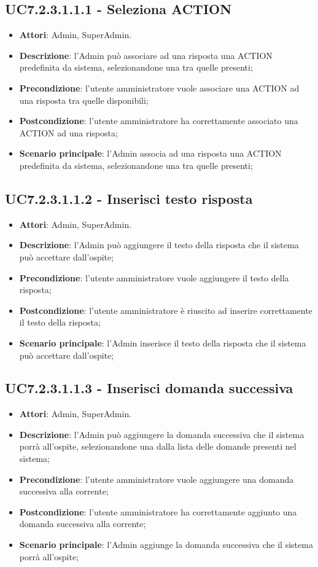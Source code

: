 \documentclass[../AnalisiDeiRequisiti_v3.0.0.tex]{subfiles}
\begin{document}
\subsection{UC7.2.3.1.1.1 - Seleziona ACTION} 
\label{sssec:UC7.2.3.1.1.1} 
\begin{itemize} 
\item \textbf{Attori}: Admin, SuperAdmin.
\item \textbf{Descrizione}: l'Admin può associare ad una risposta una ACTION predefinita da sistema, selezionandone una tra quelle presenti;
\item \textbf{Precondizione}: l'utente amministratore vuole associare una ACTION ad una risposta tra quelle disponibili;
\item \textbf{Postcondizione}: l'utente amministratore ha correttamente associato una ACTION ad una risposta;\item \textbf{Scenario principale}: l'Admin associa ad una risposta una ACTION predefinita da sistema, selezionandone una tra quelle presenti;
\end{itemize} 
\subsection{UC7.2.3.1.1.2 - Inserisci testo risposta} 
\label{sssec:UC7.2.3.1.1.2} 
\begin{itemize} 
\item \textbf{Attori}: Admin, SuperAdmin.
\item \textbf{Descrizione}: l'Admin può aggiungere il testo della risposta che il sistema può accettare dall'ospite;
\item \textbf{Precondizione}: l'utente amministratore vuole aggiungere il testo della risposta;
\item \textbf{Postcondizione}: l'utente amministratore è riuscito ad inserire correttamente il testo della risposta;
\item \textbf{Scenario principale}: l'Admin inserisce il testo della risposta che il sistema può accettare dall'ospite;
\end{itemize} 
\subsection{UC7.2.3.1.1.3 - Inserisci domanda successiva} 
\label{sssec:UC7.2.3.1.1.3} 
\begin{itemize} 
\item \textbf{Attori}: Admin, SuperAdmin.
\item \textbf{Descrizione}: l'Admin può aggiungere la domanda successiva che il sistema porrà all'ospite, selezionandone una dalla lista delle domande presenti nel sistema;
\item \textbf{Precondizione}: l'utente amministratore vuole aggiungere una domanda successiva alla corrente;
\item \textbf{Postcondizione}: l'utente amministratore ha correttamente aggiunto una domanda successiva alla corrente;
\item \textbf{Scenario principale}: l'Admin aggiunge la domanda successiva che il sistema porrà all'ospite;
\end{itemize} 
\newpage
\end{document}
